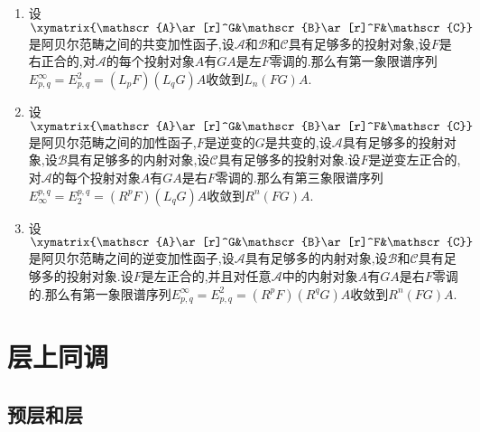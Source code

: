 \begin{enumerate}
\begin{proof}
		最后一个同构因为$0\to B\to Z\to H\to0$分裂得到$0\to FB\to FZ\to FH\to0$也是正合的.综上对双复形$FM^{\bullet,\bullet}$求行复形的同调得到的是$FH^{q,p}$.按照定义$H^{q,\bullet}$是$H^q(GE^A)=(R^qG)A$的内射预解,所以再作用$F$取同调得到的是$(R^pF)(R^qG)A$.最后按照第二谱序列收敛到同调,我们证明了$H^n(\mathrm{Tot}(FM))\cong R^n(FG)A,\forall n$,说明第二谱序列也收敛到$R^n(FG)A$,也即$E_{\infty}^{p,q}=E_2^{p,q}=(R^pF)(R^qG)A$收敛到$R^n(FG)A$.
	\end{proof}
	\item 设$\xymatrix{\mathscr{A}\ar[r]^G&\mathscr{B}\ar[r]^F&\mathscr{C}}$是阿贝尔范畴之间的共变加性函子,设$\mathscr{A}$和$\mathscr{B}$和$\mathscr{C}$具有足够多的投射对象,设$F$是右正合的,对$\mathscr{A}$的每个投射对象$A$有$GA$是左$F$零调的.那么有第一象限谱序列$E^{\infty}_{p,q}=E^2_{p,q}=(L_pF)(L_qG)A$收敛到$L_n(FG)A$.
	\item 设$\xymatrix{\mathscr{A}\ar[r]^G&\mathscr{B}\ar[r]^F&\mathscr{C}}$是阿贝尔范畴之间的加性函子,$F$是逆变的$G$是共变的,设$\mathscr{A}$具有足够多的投射对象,设$\mathscr{B}$具有足够多的内射对象,设$\mathscr{C}$具有足够多的投射对象.设$F$是逆变左正合的,对$\mathscr{A}$的每个投射对象$A$有$GA$是右$F$零调的.那么有第三象限谱序列$E_{\infty}^{p,q}=E_2^{p,q}=(R^pF)(L_qG)A$收敛到$R^n(FG)A$.
	\item 设$\xymatrix{\mathscr{A}\ar[r]^G&\mathscr{B}\ar[r]^F&\mathscr{C}}$是阿贝尔范畴之间的逆变加性函子,设$\mathscr{A}$具有足够多的内射对象,设$\mathscr{B}$和$\mathscr{C}$具有足够多的投射对象.设$F$是左正合的,并且对任意$\mathscr{A}$中的内射对象$A$有$GA$是右$F$零调的.那么有第一象限谱序列$E^{\infty}_{p,q}=E^2_{p,q}=(R^pF)(R^qG)A$收敛到$R^n(FG)A$.
\end{enumerate}
\newpage
\section{层上同调}
\subsection{预层和层}

